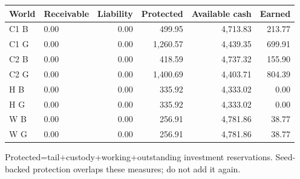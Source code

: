\documentclass[10pt,letterpaper]{article}
\begin{document}
\vspace{7pt}
\par\noindent\begin{tabularx}{\linewidth}{@{}lXrrrr@{}}\toprule World & Receivable & Liability & Protected & Available cash & Earned \\ \midrule
C1 B & 0.00 & 0.00 & 499.95 & 4,713.83 & 213.77 \\
C1 G & 0.00 & 0.00 & 1,260.57 & 4,439.35 & 699.91 \\
C2 B & 0.00 & 0.00 & 418.59 & 4,737.32 & 155.90 \\
C2 G & 0.00 & 0.00 & 1,400.69 & 4,403.71 & 804.39 \\
H B & 0.00 & 0.00 & 335.92 & 4,333.02 & 0.00 \\
H G & 0.00 & 0.00 & 335.92 & 4,333.02 & 0.00 \\
W B & 0.00 & 0.00 & 256.91 & 4,781.86 & 38.77 \\
W G & 0.00 & 0.00 & 256.91 & 4,781.86 & 38.77 \\\bottomrule\end{tabularx}\par
\small Protected=tail+custody+working+outstanding investment reservations. Seed-backed protection overlaps these measures; do not add it again.\normalsize
\end{document}
